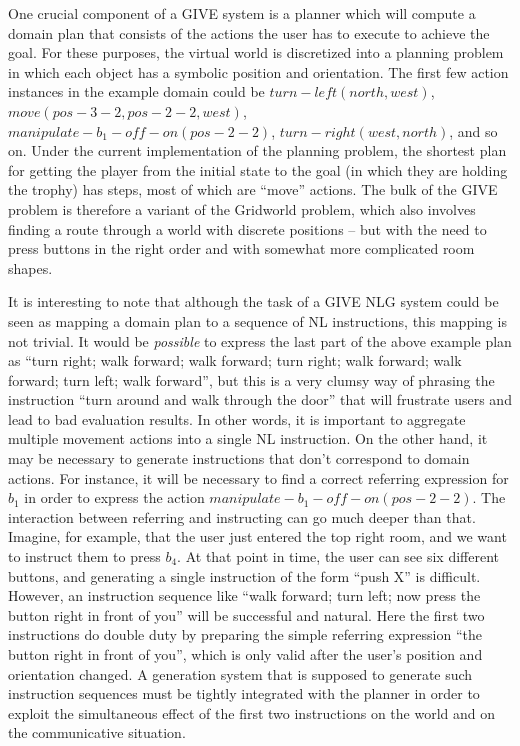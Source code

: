 One crucial component of a GIVE system is a planner which will compute
a domain plan that consists of the actions the user has to execute to
achieve the goal.  For these purposes, the virtual world is
discretized into a planning problem in which each object has a
symbolic position and orientation.  The first few action instances in
the example domain could be $turn-left(north,west)$, $move(pos-3-2,
pos-2-2, west)$, $manipulate-b_1-off-on(pos-2-2)$,
$turn-right(west,north)$,  and so on.  Under the
current implementation of the planning problem, the shortest plan for
getting the player from the initial state to the goal (in which they
are holding the trophy) has  steps, most of which are
``move'' actions.  The bulk of the GIVE problem is therefore a variant
of the Gridworld problem, which also involves finding a route through
a world with discrete positions -- but with the need to press buttons
in the right order and with somewhat more complicated room shapes.

It is interesting to note that although the task of a GIVE NLG system
could be seen as mapping a domain plan to a sequence of NL
instructions, this mapping is not trivial.  It would be
\emph{possible} to express the last part of the above example plan as
``turn right; walk forward; walk forward; turn right; walk forward;
walk forward; turn left; walk forward'', but this is a very clumsy way
of phrasing the instruction ``turn around and walk through the door''
that will frustrate users and lead to bad evaluation results.  In
other words, it is important to aggregate multiple movement actions
into a single NL instruction.  On the other hand, it may be necessary
to generate instructions that don't correspond to domain actions.  For
instance, it will be necessary to find a correct referring expression
for $b_1$ in order to express the action
$manipulate-b_1-off-on(pos-2-2)$.  The interaction between referring
and instructing can go much deeper than that.  Imagine, for example,
that the user just entered the top right room, and we want to instruct
them to press $b_4$.  At that point in time, the user can see six
different buttons, and generating a single instruction of the form
``push X'' is difficult.  However, an instruction sequence like ``walk
forward; turn left; now press the button right in front of you'' will
be successful and natural.  Here the first two instructions do double
duty by preparing the simple referring expression ``the button right
in front of you'', which is only valid after the user's position and
orientation changed.  A generation system that is supposed to generate
such instruction sequences must be tightly integrated with the planner
in order to exploit the simultaneous effect of the first two
instructions on the world and on the communicative situation.



